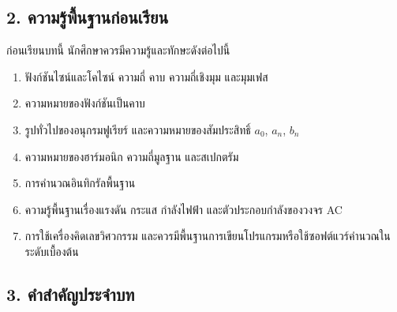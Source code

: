\subsection{2. ความรู้พื้นฐานก่อนเรียน}

ก่อนเรียนบทนี้ นักศึกษาควรมีความรู้และทักษะดังต่อไปนี้

\begin{enumerate}
    \item ฟังก์ชันไซน์และโคไซน์ ความถี่ คาบ ความถี่เชิงมุม และมุมเฟส
    \item ความหมายของฟังก์ชันเป็นคาบ
    \item รูปทั่วไปของอนุกรมฟูเรียร์ และความหมายของสัมประสิทธิ์ $a_0$, $a_n$, $b_n$
    \item ความหมายของฮาร์มอนิก ความถี่มูลฐาน และสเปกตรัม
    \item การคำนวณอินทิกรัลพื้นฐาน
    \item ความรู้พื้นฐานเรื่องแรงดัน กระแส กำลังไฟฟ้า และตัวประกอบกำลังของวงจร AC
    \item การใช้เครื่องคิดเลขวิศวกรรม และควรมีพื้นฐานการเขียนโปรแกรมหรือใช้ซอฟต์แวร์คำนวณในระดับเบื้องต้น
\end{enumerate}



\subsection{3. คำสำคัญประจำบท}

